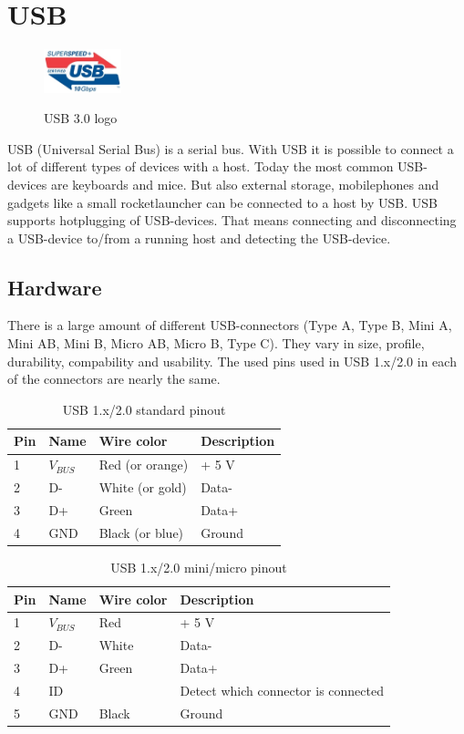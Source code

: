 \documentclass{acm_proc_article-sp}
\begin{document}
\section{USB}
\label{sec:usb}
\begin{figure}
\centering
\includegraphics[width=0.2\textwidth]{usblogo.jpg}
\label{fig:usblogo}
\caption{USB 3.0 logo \cite{usborg}}
\end{figure}
USB (Universal Serial Bus) is a serial bus.
With USB it is possible to connect a lot of different types of devices with a host.
Today the most common USB-devices are keyboards and mice. But also external storage, mobilephones and gadgets like a small rocketlauncher can be connected to a host by USB. USB supports hotplugging of USB-devices. That means connecting and disconnecting a USB-device to/from a running host and detecting the USB-device. \cite{wiki} \cite{wiki2}
\subsection{Hardware}
There is a large amount of different USB-connectors (Type A, Type B, Mini A, Mini AB, Mini B, Micro AB, Micro B, Type C). They vary in size, profile, durability, compability and usability.
The used pins used in USB 1.x/2.0 in each of the connectors are nearly the same. \cite{wiki} \cite{wiki2} \cite{usborg}

\begin{table}
\centering
\caption{USB 1.x/2.0 standard pinout \cite{wiki}}
\begin{tabular}{|l|l|l|l|} \hline
Pin & Name & Wire color & Description\\ \hline
1 & $V_{BUS}$ & Red (or orange) & + 5 V\\ \hline
2 & D- & White (or gold) & Data-\\ \hline
3 & D+ & Green & Data+\\ \hline
4 & GND & Black (or blue) & Ground\\ \hline
\end{tabular}
\end{table}

\begin{table}
\centering
\caption{USB 1.x/2.0 mini/micro pinout \cite{wiki}}
\begin{tabular}{|l|l|l|l|} \hline
Pin & Name & Wire color & Description\\ \hline
1 & $V_{BUS}$ & Red & + 5 V\\ \hline
2 & D- & White & Data-\\ \hline
3 & D+ & Green & Data+\\ \hline
4 & ID &  & Detect which connector is connected\\ \hline
5 & GND & Black & Ground\\ \hline
\end{tabular}
\end{table}
\end{document}
